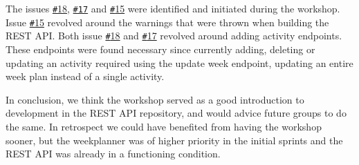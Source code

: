 The issues \href{https://github.com/aau-giraf/web-api/issues/18}{\texttt{\#}18}, \href{https://github.com/aau-giraf/web-api/issues/17}{\texttt{\#17}} and \href{https://github.com/aau-giraf/web-api/issues/15}{\texttt{\#}15} were identified and initiated during the workshop.
Issue \href{https://github.com/aau-giraf/web-api/issues/15}{\texttt{\#}15} revolved around the warnings that were thrown when building the REST API.
Both issue \href{https://github.com/aau-giraf/web-api/issues/18}{\texttt{\#}18} and \href{https://github.com/aau-giraf/web-api/issues/17}{\texttt{\#}17} revolved around adding activity endpoints.
These endpoints were found necessary since currently adding, deleting or updating an activity required using the update week endpoint, updating an entire week plan instead of a single activity. 
 
In conclusion, we think the workshop served as a good introduction to development in the REST API repository, and would advice future groups to do the same.
In retrospect we could have benefited from having the workshop sooner, but the weekplanner was of higher priority in the initial sprints and the REST API was already in a functioning condition.

